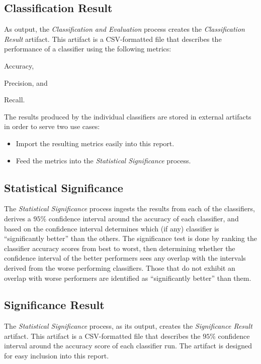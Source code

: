 \documentclass[conference]{sig-alternate-05-2015}
\begin{document}
\subsection{Classification Result}\label{subsec:classification_result}
As output, the \textit{Classification and Evaluation} process creates the
\textit{Classification Result} artifact. This artifact is a CSV-formatted file
that describes the performance of a classifier using the following metrics:
\begin{enumerate*}[(1)]
  \item Accuracy,
  \item Precision, and
  \item Recall.
\end{enumerate*}

The results produced by the individual classifiers are stored in external
artifacts in order to serve two use cases:

\begin{itemize}
  \item Import the resulting metrics easily into this report.
  \item Feed the metrics into the \textit{Statistical Significance} process.
\end{itemize}

\subsection{Statistical Significance}\label{subsec:stat_significance}
The \textit{Statistical Significance} process ingests the results from each of the
classifiers, derives a $95$\% confidence interval around the accuracy of each
classifier, and based on the confidence interval determines which (if any)
classifier is ``significantly better'' than the others. The significance test
is done by ranking the classifier accuracy scores from best to worst, then
determining whether the confidence interval of the better performers sees any
overlap with the intervals derived from the worse performing classifiers. Those
that do not exhibit an overlap with worse performers are identified as
``significantly better'' than them.

\subsection{Significance Result}\label{subsec:stat_sig_result}
The \textit{Statistical Significance} process, as its output, creates the
\textit{Significance Result} artifact. This artifact is a CSV-formatted file
that describes the $95$\% confidence interval around the accuracy score of each
classifier run. The artifact is designed for easy inclusion into this report.
\end{document}
